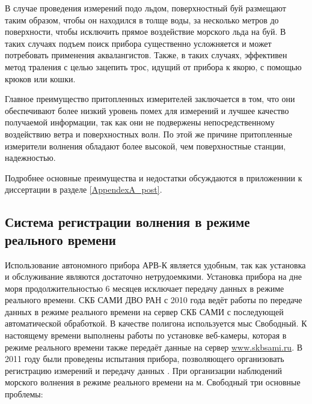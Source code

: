 В случае проведения измерений подо льдом, поверхностный буй размещают таким образом, чтобы он находился в толще воды, за несколько метров до поверхности, чтобы исключить прямое воздействие морского льда на буй. В таких случаях подъем поиск прибора существенно усложняется и может потребовать применения аквалангистов. Также, в таких случаях, эффективен метод траления с целью зацепить трос, идущий от прибора к якорю, с помощью крюков или кошки.

Главное преимущество притопленных измерителей заключается в том, что они обеспечивают более низкий уровень помех для измерений и лучшее качество получаемой информации, так как они не подвержены непосредственному воздействию ветра и поверхностных волн. По этой же причине притопленные измерители волнения обладают более высокой, чем поверхностные станции, надежностью.

Подробнее основные преимущества и недостатки обсуждаются в приложеннии к диссертации в разделе \ref{AppendexA_post}.


\subsection{Система регистрации волнения в режиме реального времени}

Использование автономного прибора АРВ-К является удобным, так как установка и обслуживание являются достаточно нетрудоемкими. Установка прибора на дне моря продолжительностью 6 месяцев исключает передачу данных в режиме реального времени. СКБ САМИ ДВО РАН с 2010 года ведёт работы по передаче данных в режиме реального времени на сервер СКБ САМИ с последующей автоматической обработкой. В качестве полигона используется мыс Свободный. К настоящему времени выполнены работы по установке веб-камеры, которая в режиме реального времени также передаёт данные на сервер \url{www.skbsami.ru}. В 2011 году были проведены испытания прибора, позволяющего организовать регистрацию измерений и передачу данных \cite{Zaits_Kuz_NGTU_2013}. При организации наблюдений морского волнения в режиме реального времени на м. Свободный три основные проблемы:

